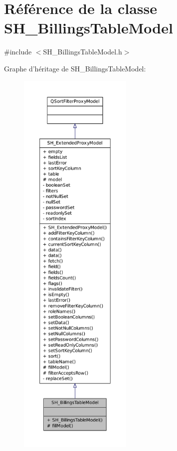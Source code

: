 \hypertarget{classSH__BillingsTableModel}{\section{Référence de la classe S\-H\-\_\-\-Billings\-Table\-Model}
\label{classSH__BillingsTableModel}
}


{\ttfamily \#include $<$S\-H\-\_\-\-Billings\-Table\-Model.\-h$>$}



Graphe d'héritage de S\-H\-\_\-\-Billings\-Table\-Model\-:\nopagebreak
\begin{figure}[H]
\begin{center}
\leavevmode
\includegraphics[height=550pt]{classSH__BillingsTableModel__inherit__graph}
\end{center}
\end{figure}


